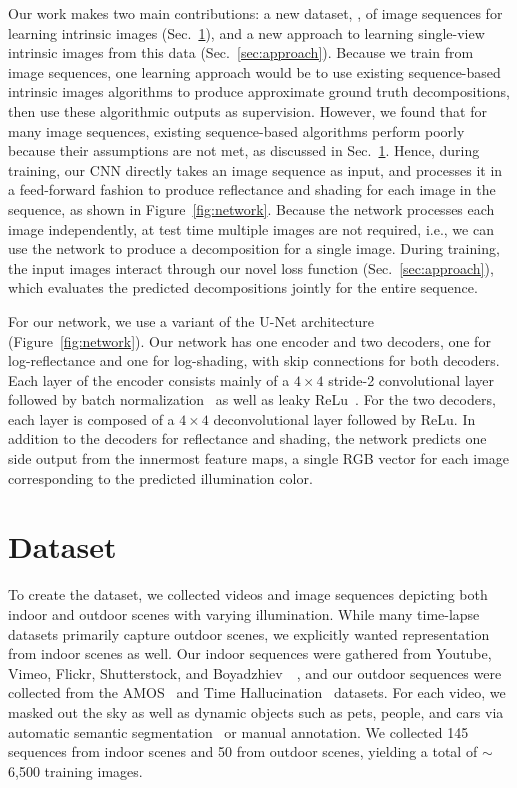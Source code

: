 \documentclass[10pt,twocolumn,letterpaper]{article}
\begin{document}
Our work makes two main contributions: a new dataset, \BT, of image
sequences for learning intrinsic images
(Sec.~\ref{sec:dataset}), and a new
approach to learning single-view intrinsic images from this data
(Sec.~\ref{sec:approach}).  Because we train from image sequences,
one learning approach would be to use existing sequence-based
intrinsic images algorithms to produce approximate ground truth
decompositions,
then use these algorithmic outputs as supervision. However, we found
that for many image sequences, existing sequence-based algorithms
perform poorly because their assumptions are not met, as discussed in
Sec.~\ref{sec:dataset}. Hence, during training, our CNN directly takes
an image sequence as input, and processes it in a feed-forward fashion
to produce reflectance and shading for each image in the sequence, as
shown in Figure~\ref{fig:network}. Because the network processes each
image independently, at test time multiple images are not required,
i.e., we can use the network to produce a decomposition for a single
image.
During training, the input images interact through our novel loss
function (Sec.~\ref{sec:approach}), which evaluates the predicted
decompositions jointly for the entire sequence. 

For our network, we use a variant of the U-Net
architecture~\cite{ronneberger2015u, isola2016image}
(Figure~\ref{fig:network}). Our network has one encoder and two
decoders, one for log-reflectance and one for log-shading, with skip
connections for both decoders.
Each layer of the encoder consists mainly of a $4\times 4$ stride-2
convolutional layer followed by batch
normalization~\cite{ioffe2015batch} as well as leaky
ReLu~\cite{he2015delving}. For the two decoders, each layer is
composed of a $4\times 4$ deconvolutional layer followed by ReLu.
In addition to the decoders for reflectance and shading, the network
predicts one side output from the innermost feature maps, a single RGB
vector for each image corresponding to the predicted illumination
color.

\section{Dataset}\label{sec:dataset}To create the \BT dataset, we collected videos and image sequences
depicting both indoor and outdoor scenes with varying
illumination. While many time-lapse datasets primarily capture outdoor
scenes, we explicitly wanted representation from indoor scenes as well. Our
indoor sequences were gathered
from Youtube, Vimeo, Flickr, Shutterstock, and
Boyadzhiev~\etal~\cite{Boyadzhiev2013UserassistedIC},
and our outdoor sequences were collected
from the AMOS~\cite{jacobs2007consistent} and Time
Hallucination~\cite{shih2013data} datasets. For each video, we masked
out the sky as well as dynamic objects such as pets, people, and
cars via automatic semantic segmentation~\cite{zhao2016pyramid} or
manual annotation. We collected 145 sequences from indoor scenes and 50 from outdoor scenes, yielding a total of $\sim$6,500 training images.
\end{document}
